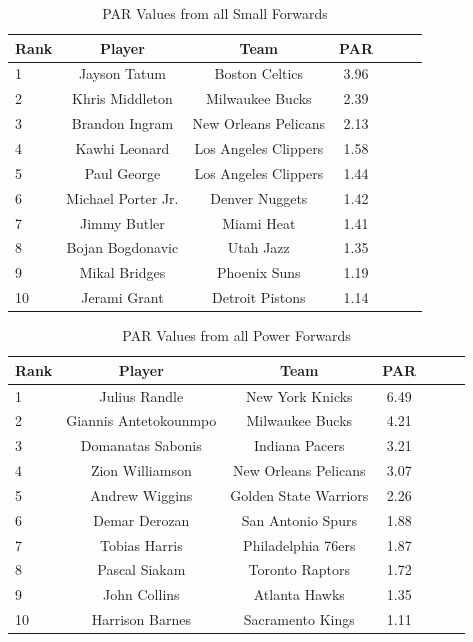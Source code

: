 \documentclass[12pt]{article}
\begin{document}
\begin{table}[H]
  \caption{PAR Values from all Small Forwards}
  \label{tab:SFtable}
\centering
\begin{tabular}[t]{lcccccc}
  \toprule
  Rank & Player & Team & PAR\\
  \midrule
 1 & Jayson Tatum & Boston Celtics & 3.96\\
 2 & Khris Middleton & Milwaukee Bucks & 2.39\\
 3 & Brandon Ingram & New Orleans Pelicans & 2.13\\
 4 & Kawhi Leonard & Los Angeles Clippers & 1.58\\
 5 & Paul George & Los Angeles Clippers & 1.44\\
 6 & Michael Porter Jr. & Denver Nuggets & 1.42\\
 7 & Jimmy Butler & Miami Heat & 1.41\\
 8 & Bojan Bogdonavic & Utah Jazz & 1.35\\
 9 & Mikal Bridges & Phoenix Suns & 1.19\\
 10 & Jerami Grant & Detroit Pistons & 1.14\\
  \bottomrule
\end{tabular}
\end{table}

\begin{table}[H]
  \caption{PAR Values from all Power Forwards}
  \label{tab:PFtable}
\centering
\begin{tabular}[t]{lcccccc}
  \toprule
  Rank & Player & Team & PAR\\
  \midrule
 1 & Julius Randle & New York Knicks & 6.49\\
 2 & Giannis Antetokounmpo & Milwaukee Bucks & 4.21\\
 3 & Domanatas Sabonis & Indiana Pacers & 3.21\\
 4 & Zion Williamson & New Orleans Pelicans & 3.07\\
 5 & Andrew Wiggins & Golden State Warriors & 2.26\\
 6 & Demar Derozan & San Antonio Spurs & 1.88\\
 7 & Tobias Harris & Philadelphia 76ers & 1.87\\
 8 & Pascal Siakam & Toronto Raptors & 1.72\\
 9 & John Collins & Atlanta Hawks & 1.35\\
 10 & Harrison Barnes & Sacramento Kings & 1.11\\
  \bottomrule
\end{tabular}
\end{table}
\end{document}
